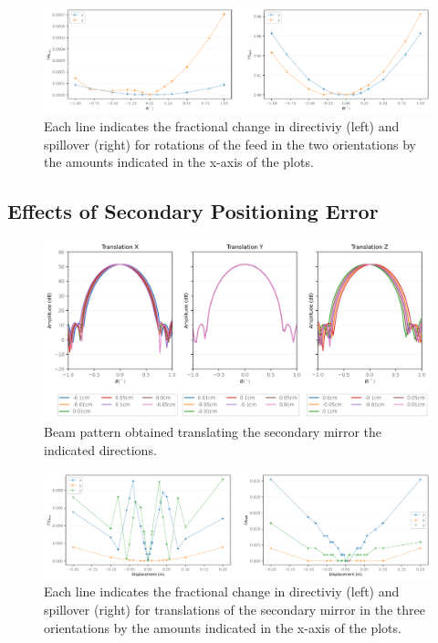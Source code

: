 \documentclass{ws-jai}
\begin{document}
\begin{figure}
\begin{center}
\includegraphics[width=7in]{figs/04_feed_rot_XY_bounds}
\end{center}
\caption{Each line indicates the fractional change in directiviy (left) and spillover (right) for rotations of the feed in the two orientations by the amounts indicated in the x-axis of the plots.}
\label{fig:feed_rot_XY_bounds}
\end{figure}

\subsection{Effects of Secondary Positioning Error}

\begin{figure}
\begin{center}
\includegraphics[width=7in]{figs/05_sec_trans_XYZ}
\end{center}
\caption{Beam pattern obtained translating the secondary mirror the indicated directions.}
\label{fig:sec_trans_XYZ}
\end{figure}

\begin{figure}
\begin{center}
\includegraphics[width=7in]{figs/06_sec_trans_XYZ_bounds}
\end{center}
\caption{Each line indicates the fractional change in directiviy (left) and spillover (right) for translations of the secondary mirror in the three orientations by the amounts indicated in the x-axis of the plots.}
\label{fig:sec_trans_XYZ_bounds}
\end{figure}
\end{document}
